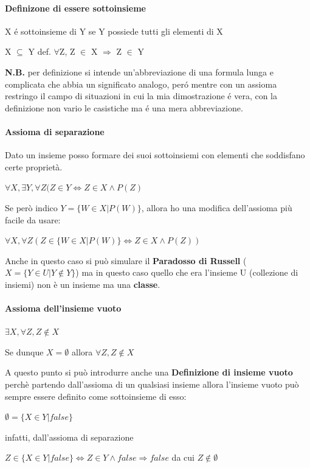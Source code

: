 \documentclass{article}
\begin{document}
\paragraph{Definizone di essere sottoinsieme} X é sottoinsieme di Y se Y possiede tutti gli elementi di X
\begin{center}
    X $\subseteq$ Y def. $\forall$Z, Z $\in$ X $\Rightarrow$ Z $\in$ Y
\end{center}
\textbf{N.B.} per definizione si intende un'abbreviazione di una formula lunga e complicata che abbia un significato analogo, peró mentre con un assioma restringo il campo di situazioni in cui la mia dimostrazione é vera, con la definizione non vario le casistiche ma é una mera abbreviazione.


\paragraph{Assioma di separazione} Dato un insieme posso formare dei suoi sottoinsiemi con elementi che soddisfano certe proprietà.
\begin{center}
    $\forall X,\exists Y,\forall Z(Z \in Y \Leftrightarrow Z \in X \land P(Z)$
\end{center}
Se però indico $Y= \{W \in X | P(W)\}$, allora ho una modifica dell'assioma più facile da usare:
\begin{center}
    $\forall X, \forall Z(Z\in \{W\in X|P(W)\} \Leftrightarrow Z \in X \land P(Z))$
\end{center}

Anche in questo caso si può simulare il \textbf{Paradosso di Russell} ($X=\{Y\in U | Y\notin Y\}$) ma in questo caso quello che era l'insieme U (collezione di insiemi) non è un insieme ma una \textbf{classe}.


\paragraph{Assioma dell'insieme vuoto}
\begin{center}
    $\exists X,\forall Z, Z \notin X$
\end{center}

Se dunque $X=\emptyset$ allora $\forall Z, Z \notin X$

A questo punto si può introdurre anche una \textbf{Definizione di insieme vuoto} perchè partendo dall'assioma di un qualsiasi insieme allora l'insieme vuoto può sempre essere definito come sottoinsieme di esso:
\begin{center}
    $\emptyset = \{X \in Y |false\}$
\end{center}
infatti, dall'assioma di separazione 
\begin{center}
    $Z \in \{X\in Y|false\} \Leftrightarrow Z\in Y \land false \Rightarrow false$ da cui $Z \notin \emptyset$
\end{center}
\end{document}
